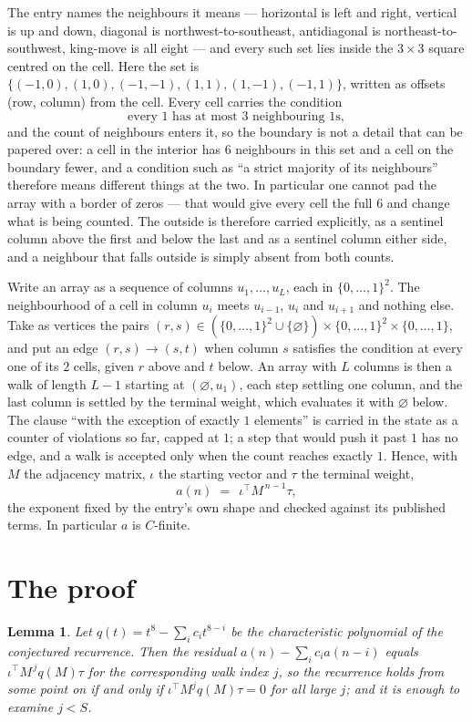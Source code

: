 \documentclass[11pt,a4paper]{article}
\theoremstyle{plain}
\newtheorem{lemma}[theorem]{Lemma}
\theoremstyle{definition}
\begin{document}
The entry names the neighbours it means --- horizontal is left and right, vertical is up and
down, diagonal is northwest-to-southeast, antidiagonal is northeast-to-southwest, king-move is
all eight --- and every such set lies inside the $3\times3$ square centred on the cell. Here
the set is $\{(-1,0), (1,0), (-1,-1), (1,1), (1,-1), (-1,1)\}$, written as offsets (row, column) from the cell. Every cell carries
the condition
\[
\text{every 1 has at most 3 neighbouring 1s},
\]
and the count of neighbours enters it, so the boundary is not a detail that can be papered
over: a cell in the interior has $6$ neighbours in this set and a cell on the boundary
fewer, and a condition such as ``a strict majority of its neighbours'' therefore means
different things at the two. In particular one cannot pad the array with a border of zeros ---
that would give every cell the full $6$ and change what is being counted. The outside is
therefore carried
explicitly, as a sentinel column above the first and below the last and as a sentinel column
either side, and a neighbour that falls outside is simply absent from both counts.

Write an array as a sequence of columns $u_1,\dots,u_L$, each in
$\{0,\dots,1\}^{2}$. The neighbourhood of a cell in column $u_i$ meets $u_{i-1}$,
$u_i$ and $u_{i+1}$ and nothing else. Take as vertices the pairs
$(r,s)\in(\{0,\dots,1\}^{2}\cup\{\varnothing\})\times\{0,\dots,1\}^{2} \times \{0,\dots,1\}$,
and put an edge $(r,s)\to(s,t)$ when column $s$ satisfies the condition at every one of its
$2$ cells, given $r$ above and $t$ below. An array with $L$ columns is then a walk of length
$L-1$ starting at $(\varnothing,u_1)$, each step settling one column, and the last column is
settled by the terminal weight, which evaluates it with $\varnothing$ below. The clause ``with the exception of exactly $1$ elements'' is carried in
the state as a counter of violations so far, capped at $1$; a step that would push it past
$1$ has no edge, and a walk is accepted only when the count reaches exactly $1$. Hence,
with $M$ the adjacency matrix, $\iota$ the starting vector and $\tau$ the terminal weight,
\[
a(n)\;=\;\,\iota^{\!\top}M^{\,n-1}\tau ,
\]
the exponent fixed by the entry's own shape and checked against its published terms. In
particular $a$ is $C$-finite.

\section{The proof}

\begin{lemma}\label{lem:crit}
Let $q(t)=t^{8}-\sum_i c_it^{8-i}$ be the characteristic polynomial of the
conjectured recurrence. Then the residual $a(n)-\sum_ic_ia(n-i)$ equals
$\iota^{\!\top}M^{\,j}q(M)\tau$ for the corresponding walk index $j$, so the
recurrence holds from some point on if and only if $\iota^{\!\top}M^{j}q(M)\tau=0$ for all
large $j$; and it is enough to examine $j<S$.
\end{lemma}
\end{document}
